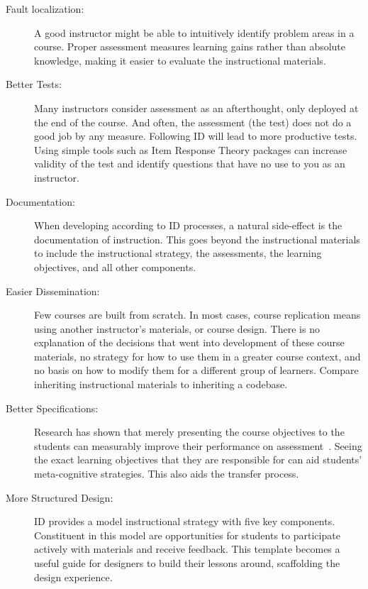 \begin{description}

\item[Fault localization:]
A good instructor might be able to intuitively identify problem areas in a course.
Proper assessment measures learning gains rather than absolute knowledge, making it easier to evaluate the instructional materials.

\item[Better Tests:]
Many instructors consider assessment as an afterthought, only deployed at the end of the course.
And often, the assessment (the test) does not do a good job by any measure.
Following ID will lead to more productive tests.
Using simple tools such as Item Response Theory packages can increase validity of the test and identify questions that have no use to you as an instructor.

\item[Documentation:]
When developing according to ID processes, a natural side-effect is the documentation of instruction.
This goes beyond the instructional materials to include the instructional strategy, the assessments, the learning objectives, and all other components.

\item[Easier Dissemination:]
Few courses are built from scratch.
In most cases, course replication means using another instructor's materials, or course design.
There is no explanation of the decisions that went into development of these course materials, no strategy for how to use them in a greater course context, and no basis on how to modify them for a different group of learners.
Compare inheriting instructional materials to inheriting a codebase. 

\item[Better Specifications:]
Research has shown that merely presenting the course objectives to the students can measurably improve their performance on assessment~\citep{torrance2007assessment}.
Seeing the exact learning objectives that they are responsible for can aid students' meta-cognitive strategies.
This also aids the transfer process.

\item[More Structured Design:]
ID provides a model instructional strategy with five key components.
Constituent  in this model are opportunities for students to participate actively with materials and receive feedback.
This template becomes a useful guide for designers to build their lessons around, scaffolding the design experience.


\end{description}
